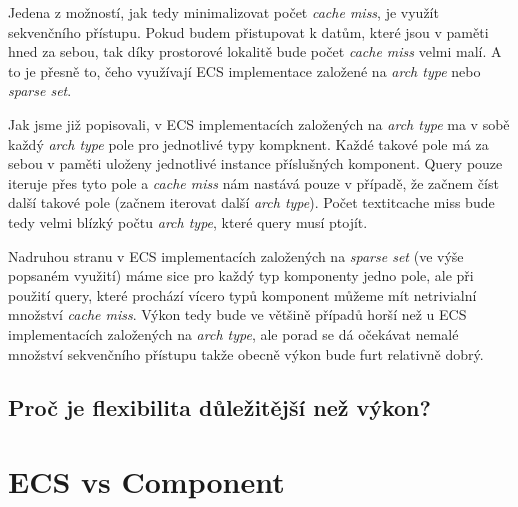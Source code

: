 Jedena z možností, jak tedy minimalizovat počet \textit{cache miss}, je využít sekvenčního přístupu. Pokud budem přistupovat k datům, které jsou v paměti hned za sebou, tak díky prostorové lokalitě bude počet \textit{cache miss} velmi malí. A to je přesně to, čeho využívají ECS implementace založené na \textit{arch type} nebo \textit{sparse set}.

Jak jsme již popisovali, v ECS implementacích založených na \textit{arch type} ma v sobě každý \textit{arch type} pole pro jednotlivé typy kompknent. Každé takové pole má za sebou v paměti uloženy jednotlivé instance příslušných komponent. Query pouze iteruje přes tyto pole a \textit{cache miss} nám nastává pouze v případě, že začnem číst další takové pole (začnem iterovat další \textit{arch type}). Počet textit{cache miss} bude tedy velmi blízký počtu \textit{arch type}, které query musí ptojít.

Nadruhou stranu v ECS implementacích založených na \textit{sparse set} (ve výše popsaném využití) máme sice pro každý typ komponenty jedno pole, ale při použití query, které prochází vícero typů komponent můžeme mít netrivialní množství \textit{cache miss}. Výkon tedy bude ve většině případů horší než u ECS implementacích založených na \textit{arch type}, ale porad se dá očekávat nemalé množství sekvenčního přístupu takže obecně výkon bude furt relativně dobrý.



\subsection{Proč je flexibilita důležitější než výkon?}


\section{ECS vs Component}





